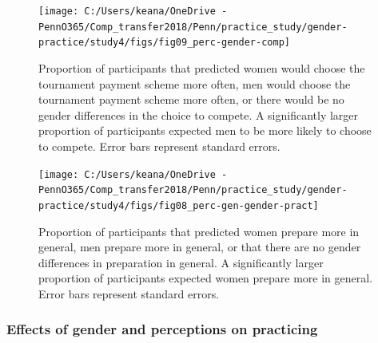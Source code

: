 \documentclass[a4paper, nobind]{templates/ociamthesis}
\begin{document}
\begin{figure}

{\centering \texttt{[image: C:/Users/keana/OneDrive - PennO365/Comp\_transfer2018/Penn/practice\_study/gender-practice/study4/figs/fig09\_perc-gender-comp]} 

}

\caption{Proportion of participants that predicted women would choose the tournament payment scheme more often, men would choose the tournament payment scheme more often, or there would be no gender differences in the choice to compete. A significantly larger proportion of participants expected men to be more likely to choose to compete. Error bars represent standard errors.}\label{fig:s305}
\end{figure}

\begin{figure}

{\centering \texttt{[image: C:/Users/keana/OneDrive - PennO365/Comp\_transfer2018/Penn/practice\_study/gender-practice/study4/figs/fig08\_perc-gen-gender-pract]} 

}

\caption{Proportion of participants that predicted women prepare more in general, men prepare more in general, or that there are no gender differences in preparation in general. A significantly larger proportion of participants expected women prepare more in general. Error bars represent standard errors.}\label{fig:s306}
\end{figure}

\hypertarget{effects-of-gender-and-perceptions-on-practicing-3}{%
\subsubsection{Effects of gender and perceptions on practicing}\label{effects-of-gender-and-perceptions-on-practicing-3}}
\end{document}
